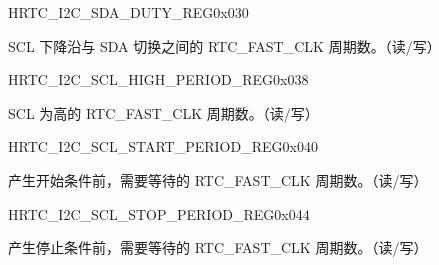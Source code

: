     
    \begin{register}{H}{RTC\_I2C\_SDA\_DUTY\_REG}{0x030}\label{regdesc:RTCI2CSDADUTYREG}
    \regnewline%
    \begin{regdesc}\begin{reglist}
    \item [RTC\_I2C\_SDA\_DUTY]SCL 下降沿与 SDA 切换之间的 RTC\_FAST\_CLK 周期数。（读/写）
    \end{reglist}\end{regdesc}
    \end{register}
    
    
    \begin{register}{H}{RTC\_I2C\_SCL\_HIGH\_PERIOD\_REG}{0x038}\label{regdesc:RTCI2CSCLHIGHPERIODREG}
    \regnewline%
    \begin{regdesc}\begin{reglist}
    \item [RTC\_I2C\_SCL\_HIGH\_PERIOD]SCL 为高的 RTC\_FAST\_CLK 周期数。（读/写）
    \end{reglist}\end{regdesc}
    \end{register}
    
    
    \begin{register}{H}{RTC\_I2C\_SCL\_START\_PERIOD\_REG}{0x040}\label{regdesc:RTCI2CSCLSTARTPERIODREG}
    \regnewline%
    \begin{regdesc}\begin{reglist}
    \item [RTC\_I2C\_SCL\_START\_PERIOD]产生开始条件前，需要等待的 RTC\_FAST\_CLK 周期数。（读/写）
    \end{reglist}\end{regdesc}
    \end{register}
    
    
    \begin{register}{H}{RTC\_I2C\_SCL\_STOP\_PERIOD\_REG}{0x044}\label{regdesc:RTCI2CSCLSTOPPERIODREG}
    \regnewline%
    \begin{regdesc}\begin{reglist}
    \item [RTC\_I2C\_SCL\_STOP\_PERIOD]产生停止条件前，需要等待的 RTC\_FAST\_CLK 周期数。（读/写）
    \end{reglist}\end{regdesc}
    \end{register}
    
    
    
    
